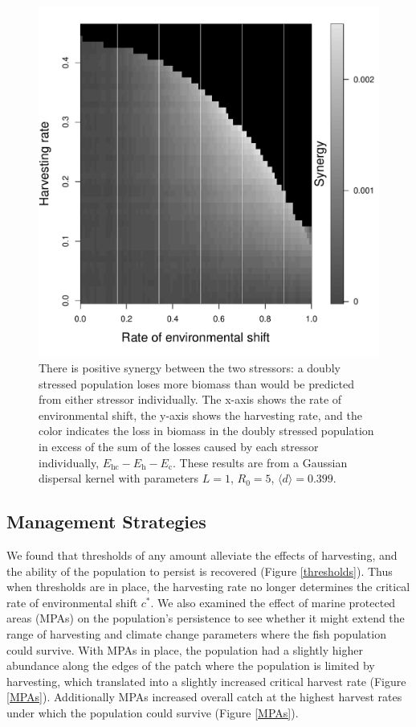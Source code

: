 \documentclass[]{article}
\begin{document}
\begin{figure}[htbp]
\begin{center}
\includegraphics[width=.75\textwidth]{plots/synergy.pdf}
\caption{There is positive synergy between the two stressors: a doubly stressed population loses more biomass than would be predicted from either stressor individually.  The x-axis shows the rate of environmental shift, the y-axis shows the harvesting rate, and the color indicates the loss in biomass in the doubly stressed population in excess of the sum of the losses caused by each stressor individually, $E_\text{hc}-E_\text{h}-E_\text{c}$.  These results are from a Gaussian dispersal kernel with parameters $L=1$, $R_0=5$, $\langle d \rangle = 0.399$.}
\label{Synergy}
\end{center}
\end{figure}

\subsection{Management Strategies }

We found that thresholds of any amount alleviate the effects of harvesting, and the ability of the population to 
persist is recovered (Figure \ref{thresholds}). Thus when thresholds are in place, the harvesting rate no longer 
determines the critical rate of environmental shift $c^*$. We also examined the effect of marine protected 
areas (MPAs) on the population's persistence to see whether it might extend the range of harvesting and 
climate change parameters where the fish population could survive. With MPAs in place, the population had a 
slightly higher abundance along the edges of the patch where the population is limited by harvesting, which 
translated into a slightly increased critical harvest rate (Figure \ref{MPAs}). Additionally MPAs increased 
overall catch at the highest harvest rates under which the population could survive (Figure \ref{MPAs}).
\end{document}
